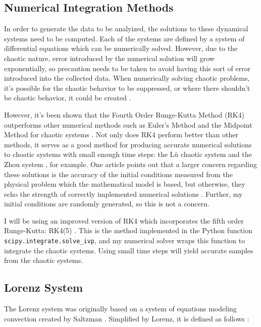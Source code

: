 \documentclass{article}
\begin{document}
\subsection{Numerical Integration Methods}

In order to generate the data to be analyized, the solutions to these
dynamical systems need to be computed. Each of the systems are defined by a
system of differential equations which can be numerically solved. However,
due to the chaotic nature, error introduced by the numerical solution will
grow exponentially, so precaution needs to be taken to avoid having this sort
of error introduced into the collected data. When numerically solving chaotic
problems, it's possible for the chaotic behavior to be suppressed, or where
there shouldn't be chaotic behavior, it could be created
\cite{corless1994good}.

However, it's been shown that the Fourth Order Runge-Kutta Method (RK4)
outperforms other numerical methods such as Euler's Method and the Midpoint
Method for chaotic systems \cite{zidan2011effect}. Not only does RK4 perform
better than other methods, it serves as a good method for producing accurate
numerical solutions to choatic systems with small enough time steps: the Lü
chaotic system \cite{mehdi2017using} and the Zhou system
\cite{roslan2013solving}, for example. One article points out that a larger
concern regarding these solutions is the accuracy of the initial conditions
measured from the physical problem which the mathematical model is based, but
otherwise, they echo the strength of correctly implemented numerical
solutions \cite{corless1994good}. Further, my initial conditions are randomly
generated, so this is not a concern.

I will be using an improved version of RK4 which incorporates the fifth order
Runge-Kutta: RK4(5) \cite{dormand1980family}. This is the method implemented
in the Python function \texttt{scipy.integrate.solve\_ivp}, and my numerical
solver wraps this function to integrate the chaotic systems. Using small time
steps will yield accurate samples from the chaotic systems.

\subsection{Lorenz System}
\label{sec:lorenz}

The Lorenz system was originally based on a system of equations modeling
convection created by Saltzman \cite{lorenz1963deterministic}
\cite{saltzman1962finite}. Simplified by Lorenz, it is defined as follows
\cite{lorenz1963deterministic}:
\end{document}
